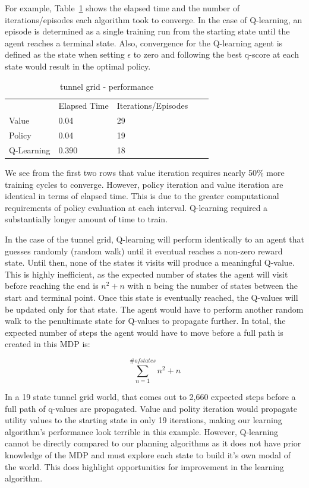 \documentclass{sig-alternate}
\begin{document}
For example, Table~\ref{tunnel-performance} shows the elapsed time and the number of iterations/episodes each algorithm took to converge. In the case of Q-learning, an episode is determined as a single training run from the starting state until the agent reaches a terminal state. Also, convergence for the Q-learning agent is defined as the state when setting $\epsilon$ to zero and following the best q-score at each state would result in the optimal policy.


\begin{table}[!htbp]
\begin{tabular}{lllll}
           & Elapsed Time & Iterations/Episodes &  &  \\
Value      & 0.04         & 29                  &  &  \\
Policy     & 0.04         & 19                  &  &  \\
Q-Learning & 0.390        & 18                  &  & 
\end{tabular}
\caption{tunnel grid - performance\label{tunnel-performance}}
\end{table}

We see from the first two rows that value iteration requires nearly 50\% more training cycles to converge. However, policy iteration and value iteration are identical in terms of elapsed time. This is due to the greater computational requirements of policy evaluation at each interval. Q-learning required a substantially longer amount of time to train.

In the case of the tunnel grid, Q-learning will perform identically to an agent that guesses randomly (random walk) until it eventual reaches a non-zero reward state. Until then, none of the states it visits will produce a meaningful Q-value. This is highly inefficient, as the expected number of states the agent will visit before reaching the end is $n^2 + n$ with n being the number of states between the start and terminal point. Once this state is eventually reached, the Q-values will be updated only for that state. The agent would have to perform another random walk to the penultimate state for Q-values to propagate further. In total, the expected number of steps the agent would have to move before a full path is created in this MDP is: 

\begin{equation}
    \sum_{n=1}^{\# of states} n^2 + n
\end{equation}

In a 19 state tunnel grid world, that comes out to 2,660 expected steps before a full path of q-values are propagated. Value and polity iteration would propagate utility values to the starting state in only 19 iterations, making our learning algorithm's performance look terrible in this example. However, Q-learning cannot be directly compared to our planning algorithms as it does not have prior knowledge of the MDP and must explore each state to build it's own modal of the world. This does highlight opportunities for improvement in the learning algorithm.
\end{document}
